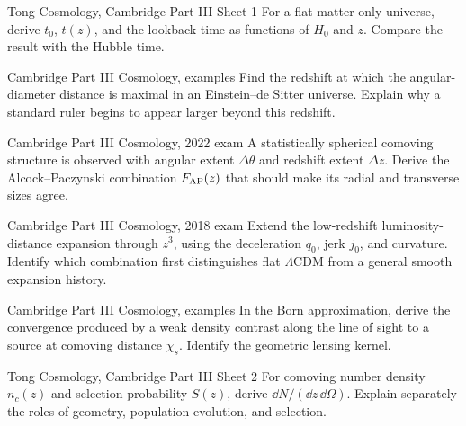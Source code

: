 \begin{exercise}{Tong Cosmology, Cambridge Part III Sheet 1}
For a flat matter-only universe, derive \(t_0\), \(t(z)\), and the lookback
time as functions of \(H_0\) and \(z\).  Compare the result with the Hubble
time.
\end{exercise}

\begin{exercise}{Cambridge Part III Cosmology, examples}
Find the redshift at which the angular-diameter distance is maximal in an
Einstein--de Sitter universe.  Explain why a standard ruler begins to appear
larger beyond this redshift.
\end{exercise}

\begin{exercise}{Cambridge Part III Cosmology, 2022 exam}
A statistically spherical comoving structure is observed with angular extent
\(\Delta\theta\) and redshift extent \(\Delta z\).  Derive the
Alcock--Paczynski combination \(F_{\rm AP}(z)\) that should make its radial and
transverse sizes agree.
\end{exercise}

\begin{exercise}{Cambridge Part III Cosmology, 2018 exam}
Extend the low-redshift luminosity-distance expansion through \(z^3\), using
the deceleration \(q_0\), jerk \(j_0\), and curvature.  Identify which
combination first distinguishes flat \(\Lambda\)CDM from a general smooth
expansion history.
\end{exercise}

\begin{exercise}{Cambridge Part III Cosmology, examples}
In the Born approximation, derive the convergence produced by a weak density
contrast along the line of sight to a source at comoving distance \(\chi_s\).
Identify the geometric lensing kernel.
\end{exercise}

\begin{exercise}{Tong Cosmology, Cambridge Part III Sheet 2}
For comoving number density \(n_c(z)\) and selection probability \(S(z)\),
derive \(\dd N/(\dd z\,\dd\Omega)\).  Explain separately the roles of geometry,
population evolution, and selection.
\end{exercise}

